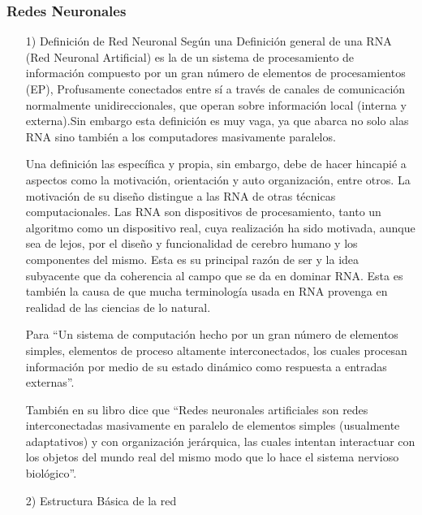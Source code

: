 \documentclass[a4paper, 12pt]{article}
\begin{document}
\subsubsection{Redes Neuronales}
\begin{enumerate}
\item[1)] Definición de Red Neuronal
\vskip 0.3cm
Según \cite{regueiro} una Definición general de una RNA (Red Neuronal Artificial) es la de un sistema de procesamiento de información compuesto por un gran número de elementos de procesamientos (EP), Profusamente conectados entre sí a través de canales de comunicación normalmente unidireccionales, que operan sobre información local (interna y externa).Sin embargo esta definición es muy vaga, ya que abarca no solo alas RNA sino también a los computadores masivamente paralelos.\par
\citep{regueiro} Una definición las específica y propia, sin embargo, debe de hacer hincapié a aspectos como la motivación, orientación y auto organización, entre otros. La motivación de su diseño distingue a las RNA de otras técnicas computacionales. Las RNA son dispositivos de procesamiento, tanto un algoritmo como un dispositivo real, cuya realización ha sido motivada, aunque sea de lejos, por el diseño y funcionalidad de cerebro humano y los componentes del mismo. Esta es su principal razón de ser y la idea subyacente que da coherencia al campo que se da en dominar RNA. Esta es también la causa de que mucha terminología usada en RNA provenga en realidad de las ciencias de lo natural.\par
Para \cite{hilera_gonzales} “Un sistema de computación hecho por un gran número de elementos simples, elementos de proceso altamente interconectados, los cuales procesan información por medio de su estado dinámico como respuesta a entradas externas”.\par
También en su libro dice que “Redes neuronales artificiales son redes interconectadas masivamente en paralelo de elementos simples (usualmente adaptativos) y con organización jerárquica, las cuales intentan interactuar con los objetos del mundo real del mismo modo que lo hace el sistema nervioso biológico”.\par
\vskip 5cm


\item[2)] Estructura Básica de la red
\vskip 0.1cm


\end{enumerate}
\end{document}
